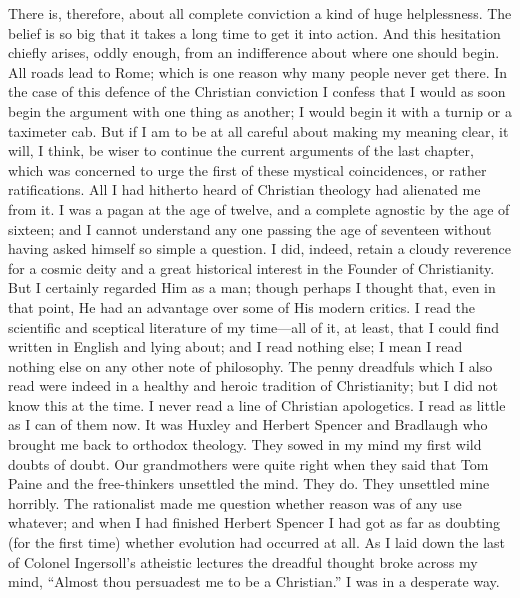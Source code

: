 There is, therefore, about all complete conviction a kind of huge helplessness. The belief is so big that it takes a long time to get it into action. And this hesitation chiefly arises, oddly enough, from an indifference about where one should begin. All roads lead to Rome; which is one reason why many people never get there. In the case of this defence of the Christian conviction I confess that I would as soon begin the argument with one thing as another; I would begin it with a turnip or a taximeter cab. But if I am to be at all careful about making my meaning clear, it will, I think, be wiser to continue the current arguments of the last chapter, which was concerned to urge the first of these mystical coincidences, or rather ratifications. All I had hitherto heard of Christian theology had alienated me from it. I was a pagan at the age of twelve, and a complete agnostic by the age of sixteen; and I cannot understand any one passing the age of seventeen without having asked himself so simple a question. I did, indeed, retain a cloudy reverence for a cosmic deity and a great historical interest in the Founder of Christianity. But I certainly regarded Him as a man; though perhaps I thought that, even in that point, He had an advantage over some of His modern critics. I read the scientific and sceptical literature of my time—all of it, at least, that I could find written in English and lying about; and I read nothing else; I mean I read nothing else on any other note of philosophy. The penny dreadfuls which I also read were indeed in a healthy and heroic tradition of Christianity; but I did not know this at the time. I never read a line of Christian apologetics. I read as little as I can of them now. It was Huxley and Herbert Spencer and Bradlaugh who brought me back to orthodox theology. They sowed in my mind my first wild doubts of doubt. Our grandmothers were quite right when they said that Tom Paine and the free-thinkers unsettled the mind. They do. They unsettled mine horribly. The rationalist made me question whether reason was of any use whatever; and when I had finished Herbert Spencer I had got as far as doubting (for the first time) whether evolution had occurred at all. As I laid down the last of Colonel Ingersoll’s atheistic lectures the dreadful thought broke across my mind, “Almost thou persuadest me to be a Christian.” I was in a desperate way.

